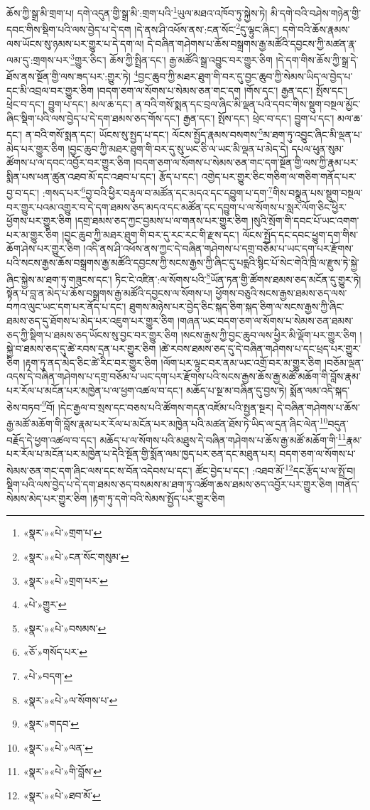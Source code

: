 ཆོས་ཀྱི་སྒྲ་མི་གྲག་པ། དགེ་འདུན་གྱི་སྒྲ་མི་:གྲག་པའི་\footnote{«སྣར་»«པེ་»གྲག་པ་}ཡུལ་མཐའ་འཁོབ་ཏུ་སྐྱེས་ཏེ། མི་དགེ་བའི་བཤེས་གཉེན་གྱི་དབང་གིས་སྡིག་པའི་ལས་བྱེད་པ་དེ་དག །དེ་ནས་ཤི་འཕོས་ནས་:ངན་སོང་\footnote{«སྣར་»«པེ་»ངན་སོང་གསུམ་}དུ་ལྟུང་ཞིང་། དགེ་བའི་ཆོས་རྣམས་ལས་ཡོངས་སུ་ཉམས་པར་གྱུར་པ་དེ་དག་ལ། དེ་བཞིན་གཤེགས་པ་ཆོས་བསྒྲགས་རྒྱ་མཚོའི་དབྱངས་ཀྱི་མཚན་རྣ་ལམ་དུ་:གྲགས་པར་\footnote{«སྣར་»«པེ་»གྲག་པར་}གྱུར་ཅིང་། ཆོས་ཀྱི་སྤྲིན་དང་། རྒྱ་མཚོའི་སྒྲ་འབྱུང་བར་གྱུར་ཅིག །དེ་དག་གིས་ཆོས་ཀྱི་སྒྲ་དེ་ཐོས་ནས་སྔོན་གྱི་ལས་ཟད་པར་:གྱུར་ཏེ། \footnote{«པེ་»གྱུར་}བྱང་ཆུབ་ཀྱི་མཐར་ཐུག་གི་བར་དུ་བྱང་ཆུབ་ཀྱི་སེམས་ཡིད་ལ་བྱེད་པ་དང་མི་འབྲལ་བར་གྱུར་ཅིག །བདག་ཅག་ལ་སོགས་པ་སེམས་ཅན་གང་དག །གོས་དང་། རྒྱན་དང་། སྤོས་དང་། ཕྲེང་བ་དང་། བྱུག་པ་དང་། མལ་ཆ་དང་། ན་བའི་གསོ་སྨན་དང་བྲལ་ཞིང་མི་ལྡན་པའི་དབང་གིས་སྡུག་བསྔལ་མྱོང་ཞིང་སྡིག་པའི་ལས་བྱེད་པ་དེ་དག་ཐམས་ཅད་གོས་དང་། རྒྱན་དང་། སྤོས་དང་། ཕྲེང་བ་དང་། བྱུག་པ་དང་། མལ་ཆ་དང་། ན་བའི་གསོ་སྨན་དང་། ཡོངས་སུ་སྤྱད་པ་དང་། ལོངས་སྤྱོད་རྣམས་བསགས་\footnote{«སྣར་»«པེ་»བསམས་}མ་ཐག་ཏུ་འབྱུང་ཞིང་མི་ལྡན་པ་མེད་པར་གྱུར་ཅིག །བྱང་ཆུབ་ཀྱི་མཐར་ཐུག་གི་བར་དུ་སུ་ཡང་ཅི་ལ་ཡང་མི་ལྡན་པ་མེད་དེ། དཔལ་ཕུན་སུམ་ཚོགས་པ་ལ་དབང་འབྱོར་བར་གྱུར་ཅིག །བདག་ཅག་ལ་སོགས་པ་སེམས་ཅན་གང་དག་སྔོན་གྱི་ལས་ཀྱི་རྣམ་པར་སྨིན་པས་ཕན་ཚུན་འཐབ་མོ་དང་འཐབ་པ་དང་། རྩོད་པ་དང་། འགྱེད་པར་གྱུར་ཅིང་གཅིག་ལ་གཅིག་གནོད་པར་བྱ་བ་དང་། :གསད་པར་\footnote{«ཅོ་»གསོད་པར་}བྱ་བའི་ཕྱིར་བརྟུལ་བ་མཚོན་དང་མདའ་དང་དབྱུག་པ་དག་\footnote{«པེ་»བདག་}གིས་བསྣུན་པས་སྡུག་བསྔལ་བར་གྱུར་པའམ་འགྱུར་བ་དེ་དག་ཐམས་ཅད་མདའ་དང་མཚོན་དང་དབྱུག་པ་ལ་སོགས་པ་སླར་ལོག་ཅིང་ཕྱིར་ཕྱོགས་པར་གྱུར་ཅིག །དགྲ་ཐམས་ཅད་ཀྱང་བྱམས་པ་ལ་གནས་པར་གྱུར་ཅིག །སུའི་སྲོག་གི་དབང་པོ་ཡང་འགག་པར་མ་གྱུར་ཅིག །བྱང་ཆུབ་ཀྱི་མཐར་ཐུག་གི་བར་དུ་རང་རང་གི་རྫས་དང་། ལོངས་སྤྱོད་དང་དབང་ཕྱུག་དག་གིས་ཆོག་ཤེས་པར་གྱུར་ཅིག །འདི་ནས་ཤི་འཕོས་ནས་ཀྱང་དེ་བཞིན་གཤེགས་པ་དགྲ་བཅོམ་པ་ཡང་དག་པར་རྫོགས་པའི་སངས་རྒྱས་ཆོས་བསྒྲགས་རྒྱ་མཚོའི་དབྱངས་ཀྱི་སངས་རྒྱས་ཀྱི་ཞིང་དུ་པདྨའི་སྙིང་པོ་སེང་གེའི་ཁྲི་ལ་རྫུས་ཏེ་སྐྱེ་ཞིང་སྐྱེས་མ་ཐག་ཏུ་གཟུངས་དང་། ཏིང་ངེ་འཛིན་:ལ་སོགས་པའི་\footnote{«སྣར་»«པེ་»ལ་སོགས་པ་}ཡོན་ཏན་གྱི་ཚོགས་ཐམས་ཅད་མངོན་དུ་གྱུར་ཏེ། སྟོན་པ་བླ་ན་མེད་པ་ཆོས་བསྒྲགས་རྒྱ་མཚོའི་དབྱངས་ལ་སོགས་པ། ཕྱོགས་བཅུའི་སངས་རྒྱས་ཐམས་ཅད་ལས་བཀའ་ལུང་ཡང་དག་པར་ནོད་པ་དང་། ཐུགས་མཉེས་པར་བྱེད་ཅིང་སྐད་ཅིག་སྐད་ཅིག་ལ་སངས་རྒྱས་ཀྱི་ཞིང་ཐམས་ཅད་དུ་ཐོགས་པ་མེད་པར་འཇུག་པར་གྱུར་ཅིག །གཞན་ཡང་བདག་ཅག་ལ་སོགས་པ་སེམས་ཅན་ཐམས་ཅད་ཀྱི་སྡིག་པ་ཐམས་ཅད་ཡོངས་སུ་བྱང་བར་གྱུར་ཅིག །སངས་རྒྱས་ཀྱི་བྱང་ཆུབ་ལས་ཕྱིར་མི་ལྡོག་པར་གྱུར་ཅིག །སྐྱེ་བ་ཐམས་ཅད་དུ་ཚེ་རབས་དྲན་པར་གྱུར་ཅིག །ཚེ་རབས་ཐམས་ཅད་དུ་དེ་བཞིན་གཤེགས་པ་དང་ཕྲད་པར་གྱུར་ཅིག །རྟག་ཏུ་ནད་མེད་ཅིང་ཚེ་རིང་བར་གྱུར་ཅིག །ལོག་པར་ལྟུང་བར་ནམ་ཡང་འགྲོ་བར་མ་གྱུར་ཅིག །བཅོམ་ལྡན་འདས་དེ་བཞིན་གཤེགས་པ་དགྲ་བཅོམ་པ་ཡང་དག་པར་རྫོགས་པའི་སངས་རྒྱས་ཆོས་རྒྱ་མཚོ་མཆོག་གི་བློས་རྣམ་པར་རོལ་པ་མངོན་པར་མཁྱེན་པ་ལ་ཕྱག་འཚལ་བ་དང་། མཆོད་པ་སྔ་མ་བཞིན་དུ་བྱས་ཏེ། སྨོན་ལམ་འདི་སྐད་ཅེས་བཏབ་\footnote{«སྣར་»གདབ་}བོ། །དེང་རྒྱལ་བ་སྲས་དང་བཅས་པའི་ཚོགས་གདན་འཛོམ་པའི་སྤྱན་སྔར། དེ་བཞིན་གཤེགས་པ་ཆོས་རྒྱ་མཚོ་མཆོག་གི་བློས་རྣམ་པར་རོལ་པ་མངོན་པར་མཁྱེན་པའི་མཚན་ཐོས་ཏེ་ཡིད་ལ་དྲན་ཞིང་ལེན་\footnote{«སྣར་»«པེ་»ལན་}བདུན་བརྗོད་དེ་ཕྱག་འཚལ་བ་དང་། མཆོད་པ་ལ་སོགས་པའི་མཐུས་དེ་བཞིན་གཤེགས་པ་ཆོས་རྒྱ་མཚོ་མཆོག་གི་\footnote{«སྣར་»«པེ་»གི་བློས་}རྣམ་པར་རོལ་པ་མངོན་པར་མཁྱེན་པ་དེའི་སྔོན་གྱི་སྨོན་ལམ་ཁྱད་པར་ཅན་དང་མཐུན་པར། བདག་ཅག་ལ་སོགས་པ་སེམས་ཅན་གང་དག་ཞིང་ལས་དང་ས་བོན་འདེབས་པ་དང་། ཚོང་བྱེད་པ་དང་། :འཐབ་མོ་\footnote{«སྣར་»«པེ་»ཐབ་མོ་}དང་རྩོད་པ་ལ་སྤྲོ་བ། སྡིག་པའི་ལས་བྱེད་པ་དེ་དག་ཐམས་ཅད་བསམས་མ་ཐག་ཏུ་འཚོག་ཆས་ཐམས་ཅད་འབྱོར་པར་གྱུར་ཅིག །གནོད་སེམས་མེད་པར་གྱུར་ཅིག །རྟག་ཏུ་དགེ་བའི་སེམས་སྤྱོད་པར་གྱུར་ཅིག 